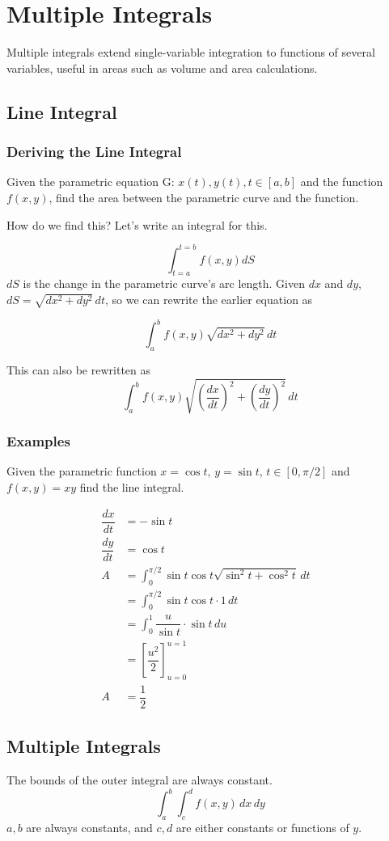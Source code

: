 \chapter{Multiple Integrals}
Multiple integrals extend single-variable integration to functions of several variables, useful in areas such as volume and area calculations.
\section{Line Integral}

\subsection{Deriving the Line Integral}
Given the parametric equation G: \(x(t), y(t), t \in [a, b]\) and the function \(f(x,y)\), find the area between the parametric curve and the function.

How do we find this? Let's write an integral for this.

\[
    \int_{t=a}^{t=b} f(x,y) dS 
\]
$dS$ is the change in the parametric curve's arc length. Given $dx$ and $dy$, \(dS = \sqrt{dx^2 + dy^2}\, dt\), so we can rewrite the earlier equation as
  
\[
    \int_{a}^{b} f(x, y) \sqrt{dx^2+dy^2}\, dt
\]

This can also be rewritten as 
\[
    \int_a^b f(x,y) \sqrt{\left(\dfrac{dx}{dt}\right)^2+\left(\dfrac{dy}{dt}\right)^2}\, dt
\]
\pagebreak
\subsection{Examples}
Given the parametric function $x = \cos{t}, \, y = \sin{t}, \,  t \in [0, \pi/2]$ and $f(x,y) = xy$ find the line integral.


\begin{align*}
    \dfrac{dx}{dt} &= -\sin{t}\qquad\qquad&\\
    \dfrac{dy}{dt} &= \cos{t}\\
    A &= \int_{0}^{\pi/2} \sin{t}\cos{t} \sqrt{\sin^2{t}+\cos^2{t}}\, dt\\
    &= \int_{0}^{\pi/2}  \sin{t}\cos{t} \cdot 1 \,dt\\
    &= \int_{0}^{1} \dfrac{u}{\sin{t}} \cdot {\sin{t}}\, du\\
    &= \left[\dfrac{u^2}{2}\right]_{u=0}^{u=1}\\
    A &= \dfrac{1}{2}
\end{align*}

\section{Multiple Integrals}
The bounds of the outer integral are always constant.
\[
    \int_{a}^{b}\int_{c}^{d} f(x,y) \,dx\,dy
\]
$a, b$ are always constants, and $c, d$ are either constants or functions of $y$.







